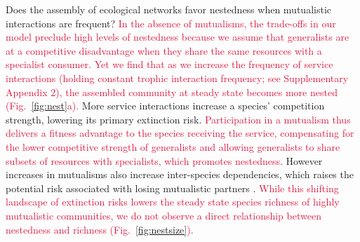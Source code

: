 \documentclass[twocolumn,preprintnumbers,amsmath,amssymb,superscriptaddress,linenumbers]{revtex4-1}
\newcommand{\rev}[1]{\textcolor{crimson}{#1}}
\begin{document}
Does the assembly of ecological networks favor nestedness when mutualistic interactions are frequent?
\rev{In the absence of mutualisms, the trade-offs in our model preclude high levels of nestedness because we assume that generalists are at a competitive disadvantage when they share the same resources with a specialist consumer.
Yet we find that as we increase the frequency of service interactions (holding constant trophic interaction frequency; see Supplementary Appendix 2), the assembled community at steady state becomes more nested (Fig.\ \ref{fig:nest}a).
}
More service interactions increase a species' competition strength, lowering its primary extinction risk.
\rev{Participation in a mutualism thus delivers a fitness advantage to the species receiving the service, compensating for the lower competitive strength of generalists and allowing generalists to share subsets of resources with specialists, which promotes nestedness.}
However increases in mutualisms also increase inter-species dependencies, which raises the potential risk associated with losing mutualistic partners \cite{Bond1994,Colwell2012}. %
\rev{While this shifting landscape of extinction risks lowers the steady state species richness of highly mutualistic communities, we do not observe a direct relationship between nestedness and richness (Fig.\ \ref{fig:nestsize}).}

% 



\end{document}
